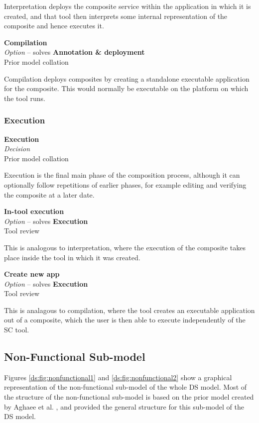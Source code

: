 Interpretation deploys the composite service within the application in which it is created, and that tool then interprets some internal representation of the composite and hence executes it.

\textbf{Compilation} \\ \emph{Option} -- solves \textbf{Annotation \& deployment} \\ Prior model collation \cite{Pietschmann2010}

Compilation deploys composites by creating a standalone executable application for the composite. This would normally be executable on the platform on which the tool runs.

\subsubsection{Execution}

\textbf{Execution} \\ \emph{Decision} \\ Prior model collation \cite{Mehandjiev2012}

Execution is the final main phase of the composition process, although it can optionally follow repetitions of earlier phases, for example editing and verifying the composite at a later date.

\textbf{In-tool execution} \\ \emph{Option} -- solves \textbf{Execution} \\ Tool review

This is analogous to interpretation, where the execution of the composite takes place inside the tool in which it was created.

\textbf{Create new app} \\ \emph{Option} -- solves \textbf{Execution} \\ Tool review

This is analagous to compilation, where the tool creates an executable application out of a composite, which the user is then able to execute independently of the SC tool.

\subsection{Non-Functional Sub-model}

Figures \ref{ds:fig:nonfunctional1} and \ref{ds:fig:nonfunctional2} show a graphical representation of the non-functional sub-model of the whole DS model. Most of the structure of the non-functional sub-model is based on the prior model created by Aghaee et al. \cite{Aghaee2012}, and provided the general structure for this sub-model of the DS model.

